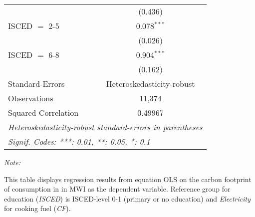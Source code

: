 \begin{table}[htbp!]
\begin{adjustbox}{width = 1\textwidth, max height = 0.95\textheight, center}
\begin{threeparttable}[b]
\begin{tabular}{lc}
                                & (0.436)\\   
            ISCED $=$ 2-5       & 0.078$^{***}$\\   
                                & (0.026)\\   
            ISCED $=$ 6-8       & 0.904$^{***}$\\   
                                & (0.162)\\   
            \midrule 
            Standard-Errors     & Heteroskedasticity-robust \\   
            Observations        & 11,374\\  
            Squared Correlation & 0.49967\\  
            \midrule \midrule
            \multicolumn{2}{l}{\emph{Heteroskedasticity-robust standard-errors in parentheses}}\\
            \multicolumn{2}{l}{\emph{Signif. Codes: ***: 0.01, **: 0.05, *: 0.1}}\\
         \end{tabular}
         
         \begin{tablenotes}\item \medskip \textit{Note:}
            \item This table displays regression results from equation OLS on the carbon footprint of consumption in  in MWI as the dependent variable.  Reference group for education (\textit{ISCED}) is ISCED-level 0-1 (primary or no education) and \textit{Electricity} for cooking fuel (\textit{CF}).
         \end{tablenotes}
      \end{threeparttable}
   \end{adjustbox}
\end{table}


